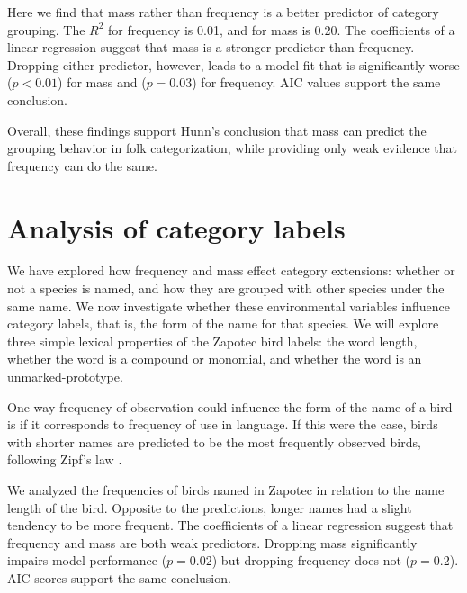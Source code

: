 \documentclass[10pt,letterpaper]{article}
\begin{document}
Here we find that mass rather than frequency is a better predictor of category grouping. The $R^2$ for frequency is 0.01, and for mass is 0.20. The coefficients of a linear regression suggest that mass is a stronger predictor than frequency. Dropping either predictor, however, leads to a model fit that is significantly worse ($p < 0.01$) for mass and ($p = 0.03$) for frequency. AIC values support the same conclusion.

Overall, these findings support Hunn's conclusion that mass can predict the grouping behavior in folk categorization, while providing only weak evidence that frequency can do the same.




\section{Analysis of category labels}

We have explored how frequency and mass effect category extensions: whether or not a species is named, and how they are grouped with other species under the same name. We now investigate whether these environmental variables influence category labels, that is, the form of the name for that species. We will explore three simple lexical properties of the Zapotec bird labels: the word length, whether the word is a compound or monomial, and whether the word is an unmarked-prototype.

One way frequency of observation could influence the form of the name of a bird is if it corresponds to frequency of use in language. If this were the case, birds with shorter names are predicted to be the most frequently observed birds, following Zipf's law \cite{zipf1936psycho,zipf1949human}. 

We analyzed the frequencies of birds named in Zapotec in relation to the name length of the bird. Opposite to the predictions, longer names had a slight tendency to be more frequent. The coefficients of a linear regression suggest that frequency and mass are both weak predictors. Dropping mass significantly impairs model performance ($p = 0.02$) but dropping frequency does not ($p = 0.2$). AIC scores support the same conclusion.

\end{document}
